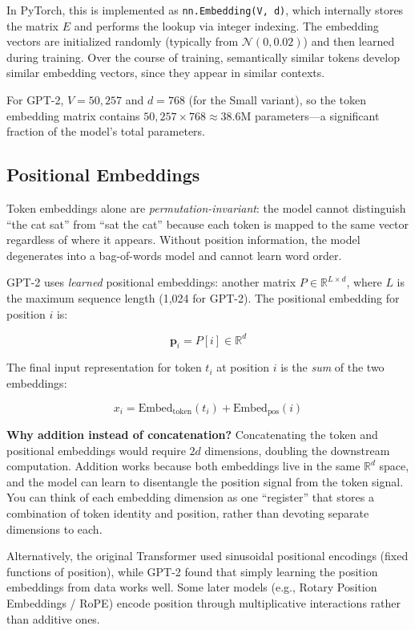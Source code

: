 In PyTorch, this is implemented as \texttt{nn.Embedding(V, d)}, which
internally stores the matrix $E$ and performs the lookup via integer indexing.
The embedding vectors are initialized randomly (typically from
$\mathcal{N}(0, 0.02)$) and then learned during training. Over the course of
training, semantically similar tokens develop similar embedding vectors, since
they appear in similar contexts.

For GPT-2, $V = 50{,}257$ and $d = 768$ (for the Small variant), so the token
embedding matrix contains $50{,}257 \times 768 \approx 38.6\text{M}$
parameters---a significant fraction of the model's total parameters.

\subsection{Positional Embeddings}

Token embeddings alone are \emph{permutation-invariant}: the model cannot
distinguish ``the cat sat'' from ``sat the cat'' because each token is mapped
to the same vector regardless of where it appears. Without position information,
the model degenerates into a bag-of-words model and cannot learn word order.

GPT-2 uses \emph{learned} positional embeddings: another matrix
$P \in \mathbb{R}^{L \times d}$, where $L$ is the maximum sequence length
(1,024 for GPT-2). The positional embedding for position $i$ is:

\[
  \mathbf{p}_i = P[i] \in \mathbb{R}^{d}
\]

The final input representation for token $t_i$ at position $i$ is the
\emph{sum} of the two embeddings:

\[
  x_i = \text{Embed}_{\text{token}}(t_i) + \text{Embed}_{\text{pos}}(i)
\]

\begin{keyconcept}
  \textbf{Why addition instead of concatenation?} Concatenating the token and
  positional embeddings would require $2d$ dimensions, doubling the
  downstream computation. Addition works because both embeddings live in the
  same $\mathbb{R}^{d}$ space, and the model can learn to disentangle the
  position signal from the token signal. You can think of each embedding
  dimension as one ``register'' that stores a combination of token identity
  and position, rather than devoting separate dimensions to each.

  Alternatively, the original Transformer used sinusoidal positional encodings
  (fixed functions of position), while GPT-2 found that simply learning the
  position embeddings from data works well. Some later models (e.g., Rotary
  Position Embeddings / RoPE) encode position through multiplicative
  interactions rather than additive ones.
\end{keyconcept}

